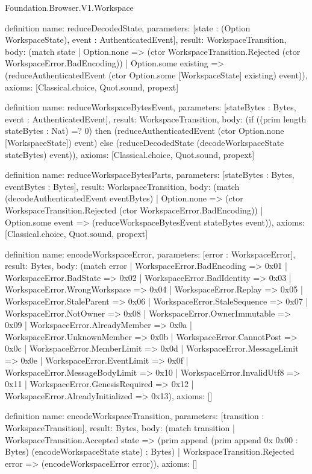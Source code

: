 \begin{lexlean}{Foundation.Browser.V1.Workspace}
\begin{semanticmodule}
definition{
  name: reduceDecodedState,
  parameters: [state : (Option WorkspaceState), event : AuthenticatedEvent],
  result: WorkspaceTransition,
  body: (match state
    | Option.none => (ctor WorkspaceTransition.Rejected (ctor WorkspaceError.BadEncoding))
    | Option.some existing => (reduceAuthenticatedEvent (ctor Option.some [WorkspaceState] existing) event)),
  axioms: [Classical.choice, Quot.sound, propext]
}

definition{
  name: reduceWorkspaceBytesEvent,
  parameters: [stateBytes : Bytes, event : AuthenticatedEvent],
  result: WorkspaceTransition,
  body: (if ((prim length stateBytes : Nat) =? 0) then (reduceAuthenticatedEvent (ctor Option.none [WorkspaceState]) event) else (reduceDecodedState (decodeWorkspaceState stateBytes) event)),
  axioms: [Classical.choice, Quot.sound, propext]
}

definition{
  name: reduceWorkspaceBytesParts,
  parameters: [stateBytes : Bytes, eventBytes : Bytes],
  result: WorkspaceTransition,
  body: (match (decodeAuthenticatedEvent eventBytes)
    | Option.none => (ctor WorkspaceTransition.Rejected (ctor WorkspaceError.BadEncoding))
    | Option.some event => (reduceWorkspaceBytesEvent stateBytes event)),
  axioms: [Classical.choice, Quot.sound, propext]
}

definition{
  name: encodeWorkspaceError,
  parameters: [error : WorkspaceError],
  result: Bytes,
  body: (match error
    | WorkspaceError.BadEncoding => 0x01
    | WorkspaceError.BadState => 0x02
    | WorkspaceError.BadIdentity => 0x03
    | WorkspaceError.WrongWorkspace => 0x04
    | WorkspaceError.Replay => 0x05
    | WorkspaceError.StaleParent => 0x06
    | WorkspaceError.StaleSequence => 0x07
    | WorkspaceError.NotOwner => 0x08
    | WorkspaceError.OwnerImmutable => 0x09
    | WorkspaceError.AlreadyMember => 0x0a
    | WorkspaceError.UnknownMember => 0x0b
    | WorkspaceError.CannotPost => 0x0c
    | WorkspaceError.MemberLimit => 0x0d
    | WorkspaceError.MessageLimit => 0x0e
    | WorkspaceError.EventLimit => 0x0f
    | WorkspaceError.MessageBodyLimit => 0x10
    | WorkspaceError.InvalidUtf8 => 0x11
    | WorkspaceError.GenesisRequired => 0x12
    | WorkspaceError.AlreadyInitialized => 0x13),
  axioms: []
}

definition{
  name: encodeWorkspaceTransition,
  parameters: [transition : WorkspaceTransition],
  result: Bytes,
  body: (match transition
    | WorkspaceTransition.Accepted state => (prim append (prim append 0x 0x00 : Bytes) (encodeWorkspaceState state) : Bytes)
    | WorkspaceTransition.Rejected error => (encodeWorkspaceError error)),
  axioms: []
}


\end{semanticmodule}
\end{lexlean}
